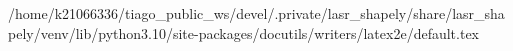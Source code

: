 /home/k21066336/tiago_public_ws/devel/.private/lasr_shapely/share/lasr_shapely/venv/lib/python3.10/site-packages/docutils/writers/latex2e/default.tex